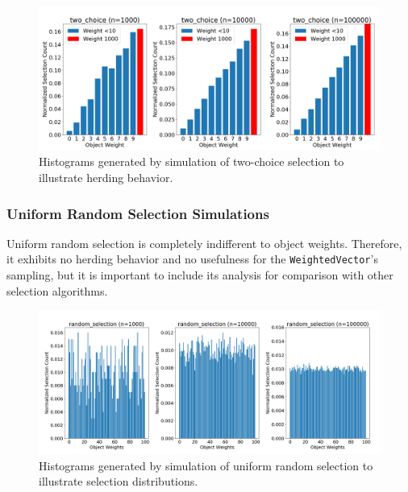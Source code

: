 \documentclass[12pt]{article}
\begin{document}
    \begin{figure}[htbp]
      \centering
      \includegraphics[scale=0.32]{images/pathological_two_choice.png} 
      \caption{Histograms generated by simulation of two-choice selection
               to illustrate herding behavior.}
      \label{fig:pathological_two_choice}
    \end{figure}

    \FloatBarrier

    \subsubsection{Uniform Random Selection Simulations}
    Uniform random selection is completely indifferent to object weights.
    Therefore, it exhibits no herding behavior and no usefulness for the
    \texttt{WeightedVector}'s sampling, but it is important to include its analysis for
    comparison with other selection algorithms.

    \begin{figure}[htbp]
      \centering
      \includegraphics[scale=0.32]{images/herding_random.png} 
      \caption{Histograms generated by simulation of uniform random selection
               to illustrate selection distributions.}
      \label{fig:herding_random}
    \end{figure}
\end{document}
